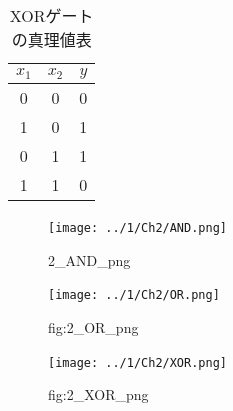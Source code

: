 \begin{table}[htb]
    \centering
    \begin{tabular}{ccc}
        $x_1$ & $x_2$ & $y$ \\  %
        \hline
        \hline
        0 & 0 & 0 \\  %
        \midrule
        1 & 0 & 1 \\  %
        \midrule  %
        0 & 1 & 1 \\ 
        \midrule  %
        1 & 1 & 0 \\
        \end{tabular}
    \caption{XORゲートの真理値表}
    \label{tab:2_XOR}
\end{table}

\begin{figure}[htb]
    \vspace{0mm}
    \begin{center}
      \hspace{0mm}
      \centering
      \texttt{[image: ../1/Ch2/AND.png]} \
      \vspace{0mm}
      \caption{2\_AND\_png}
      \label{fig:2_AND_png}
    \end{center}
  \end{figure}

  \begin{figure}[htb]
    \vspace{0mm}
    \begin{center}
      \hspace{0mm}
      \centering
      \texttt{[image: ../1/Ch2/OR.png]} \
      \vspace{0mm}
      \caption{fig:2\_OR\_png}
      \label{fig:2_OR_png}
    \end{center}
  \end{figure}

  \begin{figure}[htb]
    \vspace{0mm}
    \begin{center}
      \hspace{0mm}
      \centering
      \texttt{[image: ../1/Ch2/XOR.png]} \
      \vspace{0mm}
      \caption{fig:2\_XOR\_png}
      \label{fig:2_XOR_png}
    \end{center}
  \end{figure}

